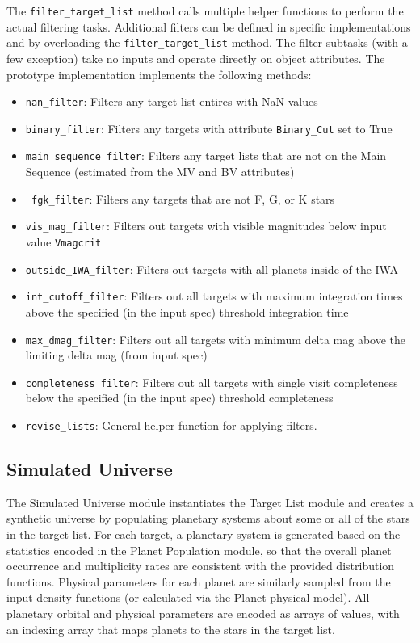 \documentclass[cleanfoot]{asme2ej}
\begin{document}
The \verb+filter_target_list+ method calls multiple helper functions to perform the actual filtering tasks.  Additional filters can be defined in specific implementations and by overloading the  \verb+filter_target_list+ method.  The filter subtasks (with a few exception) take no inputs and operate directly on object attributes. The prototype implementation implements the following methods:
\begin{itemize}
\item \verb+nan_filter+: Filters any target list entires with NaN values
\item \verb+binary_filter+: Filters any targets with attribute \verb+Binary_Cut+ set to True
\item \verb+main_sequence_filter+: Filters any target lists that are not on the Main Sequence (estimated from the MV and BV attributes)
\item \verb+ fgk_filter+: Filters any targets that are not F, G, or K stars
\item \verb+vis_mag_filter+: Filters out targets with visible magnitudes below input value \verb+Vmagcrit+
\item \verb+outside_IWA_filter+: Filters out targets with all planets inside of the IWA
\item \verb+int_cutoff_filter+: Filters out all targets with maximum integration times above the specified (in the input spec) threshold integration time
\item \verb+max_dmag_filter+: Filters out all targets with minimum delta mag above the limiting delta mag (from input spec)
\item \verb+completeness_filter+: Filters out all targets with single visit completeness below the specified (in the input spec) threshold completeness
\item \verb+revise_lists+: General helper function for applying filters.
\end{itemize}



\subsection{Simulated Universe} \label{sec:simulateduniverse}
The Simulated Universe module instantiates the Target List module and creates a synthetic universe by populating planetary systems about some or all of the stars in the target list.  For each target, a planetary system is generated based on the statistics encoded in the Planet Population module, so that the overall planet occurrence and multiplicity rates are consistent with the provided distribution functions.  Physical parameters for each planet are similarly sampled from the input density functions (or calculated via the Planet physical model).  All planetary orbital and physical parameters are encoded as arrays of values, with an indexing array that maps planets to the stars in the target list. 
\end{document}
